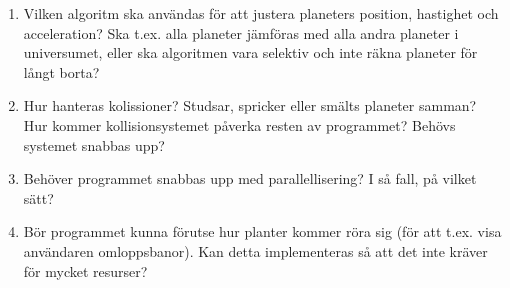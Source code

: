 \begin{enumerate}
    \item Vilken algoritm ska användas för att justera planeters
        position, hastighet och acceleration?
        Ska t.ex. alla planeter jämföras med
        alla andra planeter i universumet,
        eller ska algoritmen vara selektiv och
        inte räkna planeter för långt borta?
    \item Hur hanteras kolissioner?
        Studsar, spricker eller smälts planeter samman?
        Hur kommer kollisionsystemet påverka resten av programmet?
        Behövs systemet snabbas upp?
    \item Behöver programmet snabbas upp med parallellisering?
        I så fall, på vilket sätt?
    \item Bör programmet kunna förutse hur planter kommer röra sig
        (för att t.ex. visa användaren omloppsbanor).
        Kan detta implementeras så att det inte kräver för mycket
        resurser?
\end{enumerate}

